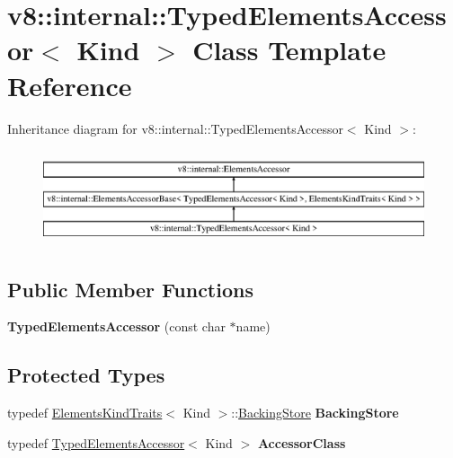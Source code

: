 \hypertarget{classv8_1_1internal_1_1_typed_elements_accessor}{}\section{v8\+:\+:internal\+:\+:Typed\+Elements\+Accessor$<$ Kind $>$ Class Template Reference}
\label{classv8_1_1internal_1_1_typed_elements_accessor}
Inheritance diagram for v8\+:\+:internal\+:\+:Typed\+Elements\+Accessor$<$ Kind $>$\+:\begin{figure}[H]
\begin{center}
\leavevmode
\includegraphics[height=2.818792cm]{classv8_1_1internal_1_1_typed_elements_accessor}
\end{center}
\end{figure}
\subsection*{Public Member Functions}
\begin{DoxyCompactItemize}
\item 
\hypertarget{classv8_1_1internal_1_1_typed_elements_accessor_aff107059211d9217ce0ea72be27fcd42}{}{\bfseries Typed\+Elements\+Accessor} (const char $\ast$name)\label{classv8_1_1internal_1_1_typed_elements_accessor_aff107059211d9217ce0ea72be27fcd42}

\end{DoxyCompactItemize}
\subsection*{Protected Types}
\begin{DoxyCompactItemize}
\item 
\hypertarget{classv8_1_1internal_1_1_typed_elements_accessor_a6e3f453922d1fad5082dd09d1b0d9d09}{}typedef \hyperlink{classv8_1_1internal_1_1_elements_kind_traits}{Elements\+Kind\+Traits}$<$ Kind $>$\+::\hyperlink{classv8_1_1internal_1_1_fixed_array_base}{Backing\+Store} {\bfseries Backing\+Store}\label{classv8_1_1internal_1_1_typed_elements_accessor_a6e3f453922d1fad5082dd09d1b0d9d09}

\item 
\hypertarget{classv8_1_1internal_1_1_typed_elements_accessor_aef47095279f76fe480381ff82a049c39}{}typedef \hyperlink{classv8_1_1internal_1_1_typed_elements_accessor}{Typed\+Elements\+Accessor}$<$ Kind $>$ {\bfseries Accessor\+Class}\label{classv8_1_1internal_1_1_typed_elements_accessor_aef47095279f76fe480381ff82a049c39}

\end{DoxyCompactItemize}
